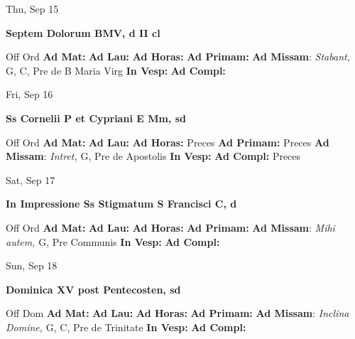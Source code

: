 \documentclass[10pt]{article}
\begin{document}
\begin{minipage}{3.5in}
\vspace{2em}\begin{center}
Thu, Sep 15
\end{center}\textbf{ \large Septem Dolorum BMV, \textnormal{\normalsize d II cl}}
\begin{justify}
Off Ord
\textbf{Ad Mat: }
\textbf{Ad Lau: }
\textbf{Ad Horas: }
\textbf{Ad Primam: }
\textbf{Ad Missam}: \textit{Stabant,} G, C, Pre de B Maria Virg
\textbf{In Vesp: }
\textbf{Ad Compl: }\end{justify}
\end{minipage}



\begin{minipage}{3.5in}
\vspace{2em}\begin{center}
Fri, Sep 16
\end{center}\textbf{ \large Ss Cornelii P et Cypriani E Mm, \textnormal{\normalsize sd}}
\begin{justify}
Off Ord
\textbf{Ad Mat: }
\textbf{Ad Lau: }
\textbf{Ad Horas: }Preces
\textbf{Ad Primam: }Preces
\textbf{Ad Missam}: \textit{Intret,} G, Pre de Apostolis
\textbf{In Vesp: }
\textbf{Ad Compl: }Preces\end{justify}
\end{minipage}



\begin{minipage}{3.5in}
\vspace{2em}\begin{center}
Sat, Sep 17
\end{center}\textbf{ \large In Impressione Ss Stigmatum S Francisci C, \textnormal{\normalsize d}}
\begin{justify}
Off Ord
\textbf{Ad Mat: }
\textbf{Ad Lau: }
\textbf{Ad Horas: }
\textbf{Ad Primam: }
\textbf{Ad Missam}: \textit{Mihi autem,} G, Pre Communis
\textbf{In Vesp: }
\textbf{Ad Compl: }\end{justify}
\end{minipage}



\begin{minipage}{3.5in}
\vspace{2em}\begin{center}
Sun, Sep 18
\end{center}\textbf{ \large Dominica XV post Pentecosten, \textnormal{\normalsize sd}}
\begin{justify}
Off Dom
\textbf{Ad Mat: }
\textbf{Ad Lau: }
\textbf{Ad Horas: }
\textbf{Ad Primam: }
\textbf{Ad Missam}: \textit{Inclina Domine,} G, C, Pre de Trinitate
\textbf{In Vesp: }
\textbf{Ad Compl: }\end{justify}
\end{minipage}
\end{document}
